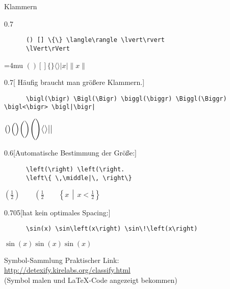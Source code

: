 \begin{frame}[fragile]{Klammern}
  \vspace{-1.5em}
  \begin{CodeExample}{0.7}
    \begin{lstlisting}
      () [] \{\} \langle\rangle \lvert\rvert
      \lVert\rVert
    \end{lstlisting}
  \CodeResult
    \Umathcloseopenspacing\textstyle=4mu
    $() [] \{\} \langle\rangle \lvert x\rvert \lVert x\rVert$
  \end{CodeExample}

  \begin{CodeExample}{0.7}[ Häufig braucht man größere Klammern.]
    \begin{lstlisting}
      \bigl(\bigr) \Bigl(\Bigr) \biggl(\biggr) \Biggl(\Biggr) \bigl<\bigr> \bigl|\bigr|
    \end{lstlisting}
  \CodeResult
    $\bigl(\bigr) \Bigl(\Bigr) \biggl(\biggr) \Biggl(\Biggr)\bigl<\bigr>\bigl|\bigr|$ 
  \end{CodeExample}

  \begin{CodeExample}{0.6}[Automatische Bestimmung der Größe:]
    \begin{lstlisting}
      \left(\right) \left(\right.
      \left\{ \,\middle|\, \right\}
    \end{lstlisting}
  \CodeResult
    $\left(\frac{1}{2}\right) \qquad \left(\frac{1}{2}\right. \qquad \left\{ x \,\middle|\, x < \frac{1}{2} \right\}$
  \end{CodeExample}
  
  \begin{CodeExample}{0.705}[hat kein optimales Spacing:]
    \begin{lstlisting}
      \sin(x) \sin\left(x\right) \sin\!\left(x\right)
    \end{lstlisting}
  \CodeResult
    $\sin(x) \sin\left(x\right) \sin\!\left(x\right)$
  \end{CodeExample}
\end{frame}

\begin{frame}[fragile]{
  Symbol-Sammlung
  \hfill{}
  \hfill{}
}
  Praktischer Link: \\
  \url{http://detexify.kirelabs.org/classify.html} \\
  (Symbol malen und \LaTeX-Code angezeigt bekommen)
\end{frame}

